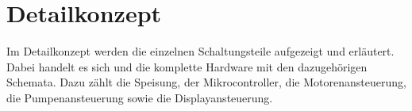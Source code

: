 \section{Detailkonzept}
\label{sec:Detailkonzept}

Im Detailkonzept werden die einzelnen Schaltungsteile aufgezeigt und erläutert. Dabei handelt es sich und die komplette Hardware mit den dazugehörigen Schemata. Dazu zählt die Speisung, der Mikrocontroller, die Motorenansteuerung, die Pumpenansteuerung sowie die Displayansteuerung.